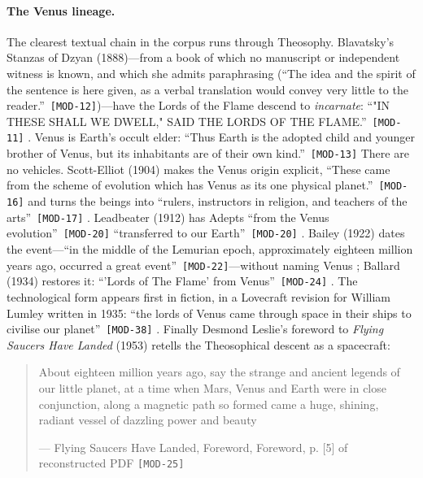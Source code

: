 \documentclass[11pt,a4paper]{article}
\newcommand{\pid}[1]{\texttt{\small #1}}
\begin{document}
\paragraph{The Venus lineage.} The clearest textual chain in the corpus runs through Theosophy. Blavatsky's Stanzas of Dzyan (1888)---from a book of which no manuscript or independent witness is known, and which she admits paraphrasing (\enquote{The idea and the spirit of the sentence is here given, as a verbal translation would convey very little to the reader.}~\pid{[MOD-12]})---have the Lords of the Flame descend to \emph{incarnate}: \enquote{"IN THESE SHALL WE DWELL," SAID THE LORDS OF THE FLAME.}~\pid{[MOD-11]} \parencite{blavatsky1888sd}. Venus is Earth's occult elder: \enquote{Thus Earth is the adopted child and younger brother of Venus, but its inhabitants are of their own kind.}~\pid{[MOD-13]} There are no vehicles. Scott-Elliot (1904) makes the Venus origin explicit, \enquote{These came from the scheme of evolution which has Venus as its one physical planet.}~\pid{[MOD-16]} and turns the beings into \enquote{rulers, instructors in religion, and teachers of the arts}~\pid{[MOD-17]} \parencite{scottelliot1904lemuria}. Leadbeater (1912) has Adepts \enquote{from the Venus evolution}~\pid{[MOD-20]} \enquote{transferred to our Earth}~\pid{[MOD-20]} \parencite{leadbeater1912textbook}. Bailey (1922) dates the event---\enquote{in the middle of the Lemurian epoch, approximately eighteen million years ago, occurred a great event}~\pid{[MOD-22]}---without naming Venus \parencite{bailey1922initiation}; Ballard (1934) restores it: \enquote{'Lords of The Flame' from Venus}~\pid{[MOD-24]} \parencite{ballard1934unveiled}. The technological form appears first in fiction, in a Lovecraft revision for William Lumley written in 1935: \enquote{the lords of Venus came through space in their ships to civilise our planet}~\pid{[MOD-38]} \parencite{lovecraft1938typer}. Finally Desmond Leslie's foreword to \emph{Flying Saucers Have Landed} (1953) retells the Theosophical descent as a spacecraft:

\begin{quote}\small About eighteen million years ago, say the strange and ancient legends of our little planet, at a time when Mars, Venus and Earth were in close conjunction, along a magnetic path so formed came a huge, shining, radiant vessel of dazzling power and beauty\par\hfill{\footnotesize --- Flying Saucers Have Landed, Foreword, Foreword, p. [5] of reconstructed PDF \pid{[MOD-25]}}\end{quote}
\end{document}
